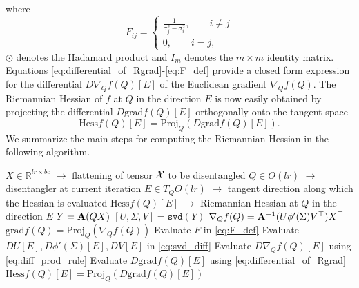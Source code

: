 \documentclass[pdflatex,sn-mathphys-num]{sn-jnl}
\newcounter{thm}[section]
\newcommand{\bfA}[1]{{\textbf A}(#1)}
\begin{document}
where 
\begin{equation} \label{eq:F_def}
F_{ij} = \begin{cases}
         \displaystyle\frac{1}{\sigma_j^2 - \sigma_i^2}, \qquad i\neq j\\
         0, \qquad i = j, 
         \end{cases}
\end{equation}
$\odot$ denotes the Hadamard product and $I_m$ denotes the $m \times m$ identity matrix. 
%
Equations \eqref{eq:differential_of_Rgrad}-\eqref{eq:F_def} provide a closed form expression for the differential $D \nabla_Q f(Q)[E]$ of the Euclidean gradient $\nabla_Q f(Q)$. The Riemannian Hessian of $f$ at $Q$ in the direction $E$ is now easily obtained by projecting the differential $D \textrm{grad} f(Q)[E]$ orthogonally onto the tangent space 
%
\begin{equation} \label{eq:hessian}
\textrm{Hess} f(Q)[E] = \textrm{Proj}_Q \left(D\textrm{grad}f(Q)[E]\right). 
\end{equation}
%
We summarize the main steps for computing the Riemannian Hessian in the following algorithm. 
\begin{algorithm} \label{alg:Riemannian_hess}
 \caption{Compute Riemannian Hessian of disentangle cost function} 
\begin{algorithmic}[1]
\Require 
\Statex $X \in \mathbb{R}^{lr \times bc}$ $\rightarrow$ flattening of tensor ${\cal X}$ to be disentangled
\Statex $Q \in O(lr)$ $\rightarrow$ disentangler at current iteration
\Statex $E \in T_Q O(lr)$ $\rightarrow$ tangent direction along which the Hessian is evaluated
%
\Ensure 
$\textrm{Hess} f(Q)[E]$ $\rightarrow$ Riemannian Hessian at $Q$ in the direction $E$
\State $Y = \bfA{QX}$
\State $[U,\Sigma,V] = \texttt{svd}(Y)$ 
\State $\nabla_Q f(Q) = {\bf A}^{-1}(U\phi'(\Sigma)V^{\top})X^{\top}$  
\State $\textrm{grad}f(Q)=\textrm{Proj}_Q\left(\nabla_Q f(Q)\right)$ 
\State Evaluate $F$ in \eqref{eq:F_def}
\State Evaluate $DU[E], D\phi'(\Sigma)[E], DV[E]$ in \eqref{eq:svd_diff} 
\State Evaluate $D\nabla_Qf(Q)[E]$ using \eqref{eq:diff_prod_rule}
\State Evaluate $D \textrm{grad}f(Q)[E]$ using \eqref{eq:differential_of_Rgrad} 
\State $\textrm{Hess} f(Q)[E] = \textrm{Proj}_Q \left(D\textrm{grad}f(Q)[E]\right)$ 
\end{algorithmic}
\end{algorithm}
\end{document}
